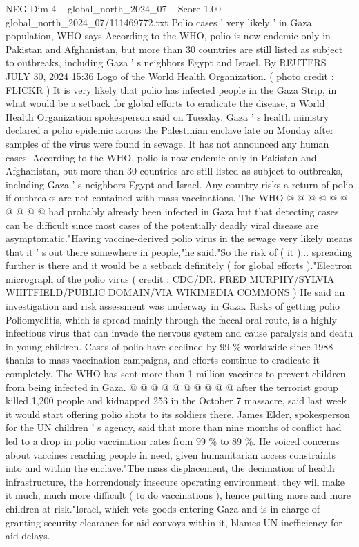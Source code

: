 \begin{textsample}{NEG Dim 4 – global\_north\_2024\_07 – Score 1.00 – global\_north\_2024\_07/111469772.txt}  \label{ex:f4_neg_289}
Polio cases ' very likely ' in Gaza population, WHO says According to the WHO, polio is now endemic only in Pakistan and Afghanistan, but more than 30 countries are still listed as subject to outbreaks, including Gaza ' s neighbors Egypt and Israel.
By REUTERS JULY 30, 2024 15:36 Logo of the World Health Organization. ( photo credit : FLICKR ) It is very likely that polio has infected people in the Gaza Strip, in what would be a setback for global efforts to eradicate the disease, a World Health Organization spokesperson said on Tuesday.
Gaza ' s health ministry declared a polio epidemic across the Palestinian enclave late on Monday after samples of the virus were found in sewage.
It has not announced any human cases.
According to the WHO, polio is now endemic only in Pakistan and Afghanistan, but more than 30 countries are still listed as subject to outbreaks, including Gaza ' s neighbors Egypt and Israel.
Any country risks a return of polio if outbreaks are not contained with mass vaccinations.
The WHO @ @ @ @ @ @ @ @ @ @ had probably already been infected in Gaza but that detecting cases can be difficult since most cases of the potentially deadly viral disease are asymptomatic."Having vaccine-derived polio virus in the sewage very likely means that it ' s out there somewhere in people,"he said."So the risk of ( it )... spreading further is there and it would be a setback definitely ( for global efforts )."Electron micrograph of the polio virus ( credit : CDC/DR.
FRED MURPHY/SYLVIA WHITFIELD/PUBLIC DOMAIN/VIA WIKIMEDIA COMMONS ) He said an investigation and risk assessment was underway in Gaza.
Risks of getting polio Poliomyelitis, which is spread mainly through the faecal-oral route, is a highly infectious virus that can invade the nervous system and cause paralysis and death in young children.
Cases of polio have declined by 99 \% worldwide since 1988 thanks to mass vaccination campaigns, and efforts continue to eradicate it completely.
The WHO has sent more than 1 million vaccines to prevent children from being infected in Gaza. @ @ @ @ @ @ @ @ @ @ after the terrorist group killed 1,200 people and kidnapped 253 in the October 7 massacre, said last week it would start offering polio shots to its soldiers there.
James Elder, spokesperson for the UN children ' s agency, said that more than nine months of conflict had led to a drop in polio vaccination rates from 99 \% to 89 \%.
He voiced concerns about vaccines reaching people in need, given humanitarian access constraints into and within the enclave."The mass displacement, the decimation of health infrastructure, the horrendously insecure operating environment, they will make it much, much more difficult ( to do vaccinations ), hence putting more and more children at risk."Israel, which vets goods entering Gaza and is in charge of granting security clearance for aid convoys within it, blames UN inefficiency for aid delays.

\end{textsample}
